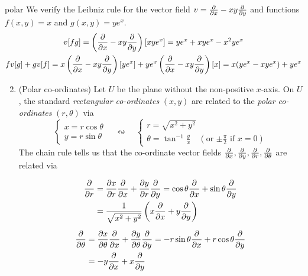 \begin{examples}{}{polar}
	\exstart We verify the Leibniz rule for the vector field $v=\partials x-xy\partials y$ and functions $f(x,y)=x$ and $g(x,y)=ye^x$.
	\begin{gather*}
		v[fg]=\left(\partials x-xy\partials y\right)[xye^x] =ye^x+xye^x-x^2ye^x\\
		fv[g]+gv[f]=x\left(\partials x-xy\partials y\right)[ye^x] +ye^x\left(\partials x-xy\partials y\right)[x] =x(ye^x-xye^x) +ye^x
	\end{gather*}

\begin{enumerate}\setcounter{enumi}{1}
  \item\label{ex:polar2} (Polar co-ordinates) 
	Let $U$ be the plane without the non-positive $x$-axis. On $U$, the standard \emph{rectangular co-ordinates} $(x,y)$ are related to the \emph{polar co-ordinates} $(r,\theta)$ via
	\[
		\begin{cases}
			x=r\cos\theta\\
			y=r\sin\theta
		\end{cases}
		\quad\leftrightsquigarrow\quad
		\begin{cases}
			r=\sqrt{x^2+y^2}\\
			\theta=\tan^{-1}\frac yx\quad (\text{or $\pm\frac\pi 2$ if $x=0$})
		\end{cases}
	\]
	The chain rule tells us that the co-ordinate vector fields $\partials x,\partials y,\partials r,\partials\theta$ are related via\par
	\begin{minipage}[t]{0.6\linewidth}\vspace{-10pt}
		\begin{gather*}
			\begin{aligned}
				\partials r&=\partials[x]{r}\partials x+\partials[y]{r}\partials{y} =\cos\theta\partials x+\sin\theta\partials y\\
				&=\frac 1{\sqrt{x^2+y^2}}\left(x\partials x+y\partials y\right)
			\end{aligned}
			\\[5pt]
			\begin{aligned}
				\partials\theta&=\partials[x]{\theta}\partials x+\partials[y]{\theta}\partials{y} =-r\sin\theta\partials x+r\cos\theta\partials y\\
				&=-y\partials x+x\partials y
			\end{aligned}
		\end{gather*}
	\end{minipage}

\end{enumerate}
\end{examples}
